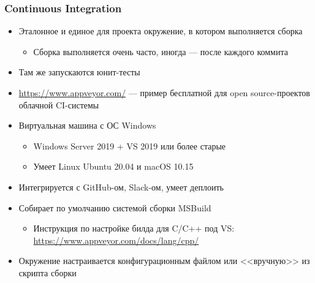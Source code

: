 \documentclass[xetex,mathserif,serif]{beamer}
\begin{document}
    \begin{frame}
        \frametitle{Continuous Integration}
        \begin{itemize}
            \item Эталонное и единое для проекта окружение, в котором выполняется сборка
            \begin{itemize}
                \item Сборка выполняется очень часто, иногда --- после каждого коммита
            \end{itemize}
            \item Там же запускаются юнит-тесты
            \item \url{https://www.appveyor.com/} --- пример бесплатной для open source-проектов облачной CI-системы
            \item Виртуальная машина с ОС Windows
            \begin{itemize}
                \item Windows Server 2019 + VS 2019 или более старые
                \item Умеет Linux Ubuntu 20.04 и macOS 10.15
            \end{itemize}
            \item Интегрируется с GitHub-ом, Slack-ом, умеет деплоить
            \item Собирает по умолчанию системой сборки MSBuild
            \begin{itemize}
                \item Инструкция по настройке билда для C/C++ под VS: \url{https://www.appveyor.com/docs/lang/cpp/}
            \end{itemize}
            \item Окружение настраивается конфигурационным файлом или <<вручную>> из скрипта сборки
        \end{itemize}
    \end{frame}
\end{document}
